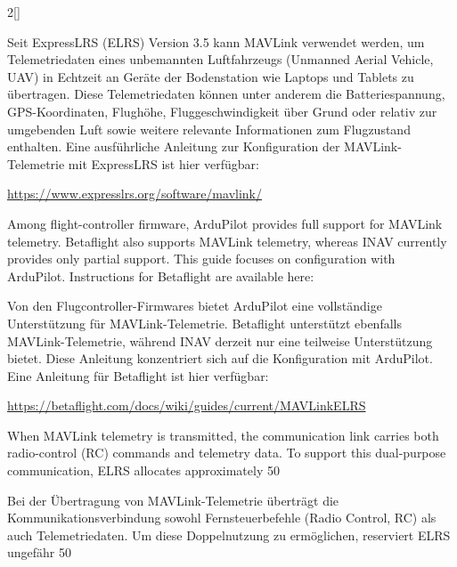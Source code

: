 \begin{paracol}{2}[]
\colger

Seit ExpressLRS (ELRS) Version 3.5 kann MAVLink verwendet werden, um Telemetriedaten eines unbemannten Luftfahrzeugs (Unmanned Aerial Vehicle, UAV) in Echtzeit an Geräte der Bodenstation wie Laptops und Tablets zu übertragen. Diese Telemetriedaten können unter anderem die Batteriespannung, GPS-Koordinaten, Flughöhe, Fluggeschwindigkeit über Grund oder relativ zur umgebenden Luft sowie weitere relevante Informationen zum Flugzustand enthalten. Eine ausführliche Anleitung zur Konfiguration der MAVLink-Telemetrie mit ExpressLRS ist hier verfügbar:

\colende

\smallskip
\url{https://www.expresslrs.org/software/mavlink/}
\smallskip

\colstart

Among flight-controller firmware, ArduPilot provides full support for MAVLink telemetry. Betaflight also supports MAVLink telemetry, whereas INAV currently provides only partial support. This guide focuses on configuration with ArduPilot. Instructions for Betaflight are available here:

\colger

Von den Flugcontroller-Firmwares bietet ArduPilot eine vollständige Unterstützung für MAVLink-Telemetrie. Betaflight unterstützt ebenfalls MAVLink-Telemetrie, während INAV derzeit nur eine teilweise Unterstützung bietet. Diese Anleitung konzentriert sich auf die Konfiguration mit ArduPilot. Eine Anleitung für Betaflight ist hier verfügbar:

\colende

\smallskip
\url{https://betaflight.com/docs/wiki/guides/current/MAVLinkELRS}
\smallskip

\colstart

When MAVLink telemetry is transmitted, the communication link carries both radio-control (RC) commands and telemetry data. To support this dual-purpose communication, ELRS allocates approximately 50%

\colger

Bei der Übertragung von MAVLink-Telemetrie überträgt die Kommunikationsverbindung sowohl Fernsteuerbefehle (Radio Control, RC) als auch Telemetriedaten. Um diese Doppelnutzung zu ermöglichen, reserviert ELRS ungefähr 50%


\end{paracol}
